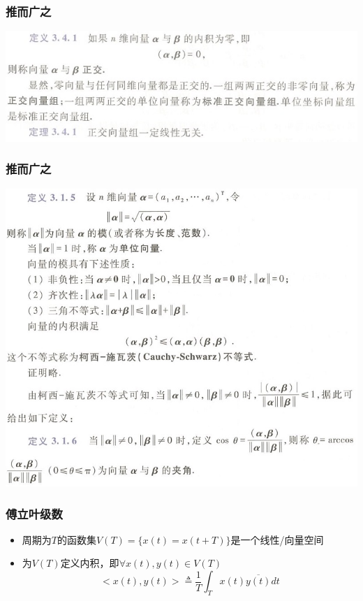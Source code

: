 \documentclass[CJKutf8,xcolor=pdftex,dvipsnames,table]{beamer}
\begin{document}
\begin{CJK*}{UTF8}{song}
\begin{frame}
\begin{center}
    \end{center}
  \end{frame}   

  \begin{frame}
    \frametitle{推而广之}
    \begin{center}
      \includegraphics[scale=.5]{cqu-la-def-3-4-1}

    \end{center}
  \end{frame}   


  \begin{frame}
    \frametitle{推而广之}
    \begin{center}
      \includegraphics[scale=.35]{cqu-la-def-3-1-5}

    \end{center}
  \end{frame}   

  
  \begin{frame}
    \frametitle{傅立叶级数}
    \begin{itemize}
	\item 周期为$T$的函数集$V(T)=\{x(t)=x(t+T)\}$是一个线性/向量空间
	\item 为$V(T)$定义内积，即$\forall x(t), y(t) \in V(T)$
	\[ 
	<x(t), y(t)> \triangleq \frac{1}{T}\int_T x(t) \overline{y(t)} dt
	\]
	

\end{itemize}
\end{frame}
\end{CJK*}
\end{document}
